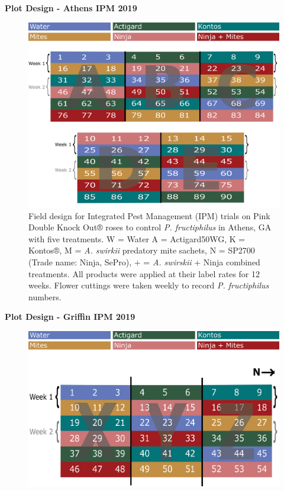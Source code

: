 \documentclass{ufdissertation}[overrideChapters] %
\begin{document}
{\textbf{Plot Design - Athens IPM 2019}
\begin{figure}

{\centering \includegraphics[width=1\linewidth]{figure/rrv_ipm_plot_map_2019_athens} 

}

\caption[Field design for Integrated Pest Management (IPM) trials on Pink Double Knock Out® roses to control \textit{P. fructiphilus} in Athens, GA with five treatments]{Field design for Integrated Pest Management (IPM) trials on Pink Double Knock Out® roses to control \textit{P. fructiphilus} in Athens, GA with five treatments. W = Water A = Actigard50WG, K = Kontos®, M = \textit{A. swirkii} predatory mite sachets, N = SP2700 (Trade name: Ninja, SePro), + = \textit{A. swirskii} + Ninja combined treatments. All products were applied at their label rates for 12 weeks. Flower cuttings were taken weekly to record \textit{P. fructiphilus} numbers.}\label{fig:athens-ipm-2019}
\end{figure}
\textbf{Plot Design - Griffin IPM 2019}
\begin{figure}

{\centering \includegraphics[width=1\linewidth]{figure/rrv_ipm_plot_map_2019_griffin} 

}
\end{figure}}
\end{document}
